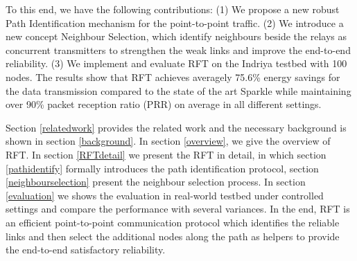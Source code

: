 \documentclass[conference]{IEEEtran}
\begin{document}
To this end, we have the following contributions: (1) We propose a new robust Path Identification mechanism for the point-to-point traffic. (2) We introduce a new concept Neighbour Selection, which identify neighbours beside the relays as concurrent transmitters to strengthen the weak links and improve the end-to-end reliability. (3) We implement and evaluate RFT on the Indriya testbed \cite{doddavenkatappa2012indriya} with 100 nodes. The results show that RFT achieves averagely 75.6\% energy savings for the data transmission compared to the state of the art Sparkle while maintaining over 90\% packet reception ratio (PRR) on average in all different settings.


Section \ref{relatedwork} provides the related work and the necessary background is shown in section \ref{background}. In section \ref{overview}, we give the overview of RFT. In section \ref{RFTdetail} we present the RFT in detail, in which section \ref{pathidentify} formally introduces the path identification protocol, section \ref{neighbourselection} present the neighbour selection process. In section \ref{evaluation} we shows the evaluation in real-world testbed under controlled settings and compare the performance with several variances. In the end, RFT is an efficient point-to-point communication protocol which identifies the reliable links and then select the additional nodes along the path as helpers to provide the end-to-end satisfactory reliability.
\end{document}
